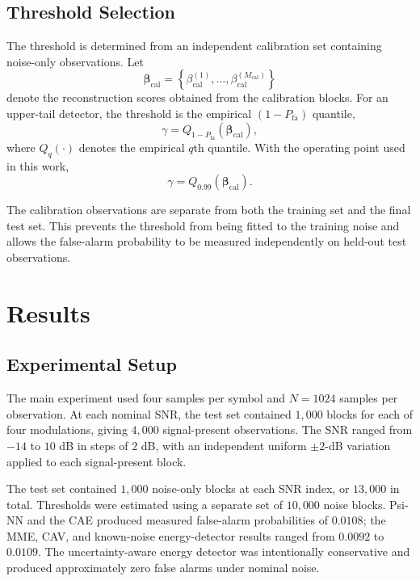\documentclass[conference]{IEEEtran}
\begin{document}
\subsection{Threshold Selection}
\label{subsec:threshold_selection}
The threshold is determined from an independent calibration set containing noise-only observations. Let
\begin{equation}
\boldsymbol{\beta}_{\mathrm{cal}}
=
\left\{
\beta_{\mathrm{cal}}^{(1)},
\ldots,
\beta_{\mathrm{cal}}^{(M_{\mathrm{cal}})}
\right\}
\label{eq:calibration_scores}
\end{equation}
denote the reconstruction scores obtained from the calibration blocks. For an upper-tail detector, the threshold is the empirical $(1-P_{\mathrm{fa}})$ quantile,
\begin{equation}
\gamma
=
Q_{1-P_{\mathrm{fa}}}
\left(
\boldsymbol{\beta}_{\mathrm{cal}}
\right),
\label{eq:empirical_gamma}
\end{equation}
where $Q_q(\cdot)$ denotes the empirical $q$th quantile. With the operating point used in this work,
\begin{equation}
\gamma
=
Q_{0.99}
\left(
\boldsymbol{\beta}_{\mathrm{cal}}
\right).
\label{eq:gamma_001}
\end{equation}

The calibration observations are separate from both the training set and the final test set. This prevents the threshold from being fitted to the training noise and allows the false-alarm probability to be measured independently on held-out test observations.

\section{Results}
\label{sec:results}
\subsection{Experimental Setup}
\label{subsec:experimental_setup}

The main experiment used four samples per symbol and $N=1024$ samples
per observation. At each nominal SNR, the test set contained $1{,}000$
blocks for each of four modulations, giving $4{,}000$ signal-present
observations. The SNR ranged from $-14$ to $10$ dB in steps of $2$ dB,
with an independent uniform $\pm2$-dB variation applied to each
signal-present block.

The test set contained $1{,}000$ noise-only blocks at each SNR index,
or $13{,}000$ in total. Thresholds were estimated using a separate set
of $10{,}000$ noise blocks. Psi-NN and the CAE produced measured
false-alarm probabilities of $0.0108$; the MME, CAV, and known-noise
energy-detector results ranged from $0.0092$ to $0.0109$. The
uncertainty-aware energy detector was intentionally conservative and
produced approximately zero false alarms under nominal noise.
\end{document}

